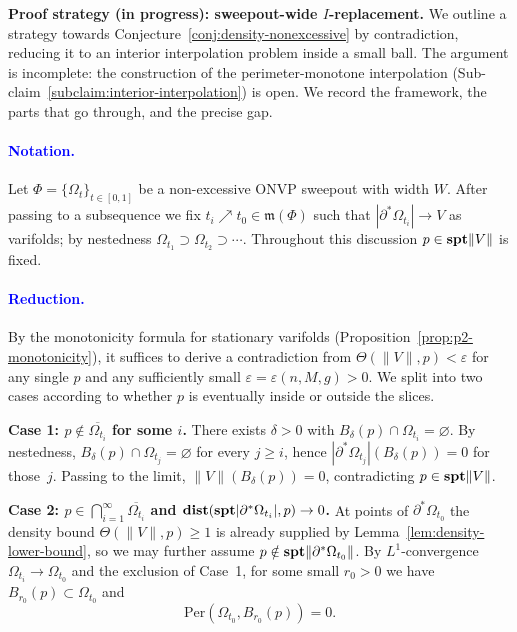 \medskip

\begingroup\color{blue}
\noindent\textbf{Proof strategy (in progress): sweepout-wide $I$-replacement.}
We outline a strategy towards Conjecture~\ref{conj:density-nonexcessive} by contradiction, reducing it to an interior interpolation problem inside a small ball. The argument is incomplete: the construction of the perimeter-monotone interpolation (Sub-claim~\ref{subclaim:interior-interpolation}) is open. We record the framework, the parts that go through, and the precise gap.

\paragraph{\textcolor{blue}{Notation.}}
Let $\Phi = \{\Omega_t\}_{t\in[0,1]}$ be a non-excessive ONVP sweepout with width $W$. After passing to a subsequence we fix $t_i \nearrow t_0 \in \mathfrak{m}(\Phi)$ such that $|\partial^*\Omega_{t_i}| \to V$ as varifolds; by nestedness $\Omega_{t_1} \supset \Omega_{t_2} \supset \cdots$. Throughout this discussion $p \in \mathbf{spt}\|V\|$ is fixed.

\paragraph{\textcolor{blue}{Reduction.}}
By the monotonicity formula for stationary varifolds (Proposition~\ref{prop:p2-monotonicity}), it suffices to derive a contradiction from $\Theta(\|V\|, p) < \varepsilon$ for any single $p$ and any sufficiently small $\varepsilon = \varepsilon(n, M, g) > 0$. We split into two cases according to whether $p$ is eventually inside or outside the slices.

\medskip
\noindent\textbf{Case 1: $p \notin \overline{\Omega_{t_i}}$ for some $i$.}
There exists $\delta > 0$ with $B_\delta(p) \cap \Omega_{t_i} = \varnothing$. By nestedness, $B_\delta(p) \cap \Omega_{t_j} = \varnothing$ for every $j \ge i$, hence $|\partial^*\Omega_{t_j}|(B_\delta(p)) = 0$ for those~$j$. Passing to the limit, $\|V\|(B_\delta(p)) = 0$, contradicting $p \in \mathbf{spt}\|V\|$.

\medskip
\noindent\textbf{Case 2: $p \in \bigcap_{i=1}^\infty \overline{\Omega_{t_i}}$ and $\mathbf{dist}(\mathbf{spt}|\partial^*\Omega_{t_i}|, p) \to 0$.}
At points of $\partial^*\Omega_{t_0}$ the density bound $\Theta(\|V\|, p) \ge 1$ is already supplied by Lemma~\ref{lem:density-lower-bound}, so we may further assume $p \notin \mathbf{spt}\|\partial^*\Omega_{t_0}\|$. By $L^1$-convergence $\Omega_{t_i} \to \Omega_{t_0}$ and the exclusion of Case~1, for some small $r_0 > 0$ we have $B_{r_0}(p) \subset \Omega_{t_0}$ and
\[
    \mathrm{Per}(\Omega_{t_0}, B_{r_0}(p)) = 0.
\]

